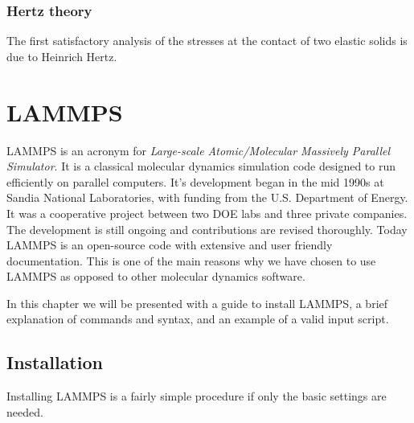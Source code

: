 \documentclass[twoside,english]{uiofysmaster}
\begin{document}
 
\subsection{Hertz theory}
The first satisfactory analysis of the stresses at the contact of two elastic solids is due to Heinrich Hertz.










\chapter{LAMMPS}

LAMMPS is an acronym for \textit{Large-scale Atomic/Molecular Massively Parallel Simulator}. 
It is a classical molecular dynamics simulation code designed to run efficiently on parallel computers. 
It's development began in the mid 1990s at Sandia National Laboratories, with funding from the U.S. Department of Energy. 
It was a cooperative project between two DOE labs and three private companies. 
The development is still ongoing and contributions are revised thoroughly. 
Today LAMMPS is an open-source code with extensive and user friendly documentation. 
This is one of the main reasons why we have chosen to use LAMMPS as opposed to other molecular dynamics software. 

In this chapter we will be presented with a guide to install LAMMPS, a brief explanation of commands and syntax, and an example of a valid input script.
\section{Installation}
Installing LAMMPS is a fairly simple procedure if only the basic settings are needed.
\end{document}
